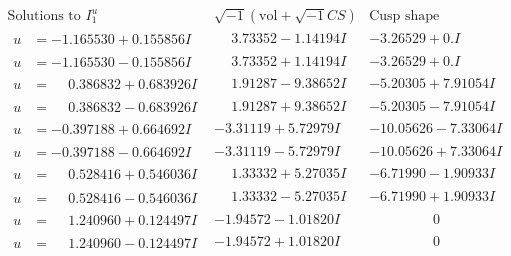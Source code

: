 \documentclass[1p]{elsarticle_modified}
\theoremstyle{definition}
\newcommand{\I}{\sqrt{-1}}
\begin{document}
$$\begin{array}{c|c|c}  
\text{Solutions to }I^u_{1}& \I (\text{vol} + \sqrt{-1}CS) & \text{Cusp shape}\\
 \hline 
\begin{aligned}
u &= -1.165530 + 0.155856 I\end{aligned}
 & \phantom{-}3.73352 - 1.14194 I & -3.26529 + 0. I\phantom{ +0.000000I} \\ \hline\begin{aligned}
u &= -1.165530 - 0.155856 I\end{aligned}
 & \phantom{-}3.73352 + 1.14194 I & -3.26529 + 0. I\phantom{ +0.000000I} \\ \hline\begin{aligned}
u &= \phantom{-}0.386832 + 0.683926 I\end{aligned}
 & \phantom{-}1.91287 - 9.38652 I & -5.20305 + 7.91054 I \\ \hline\begin{aligned}
u &= \phantom{-}0.386832 - 0.683926 I\end{aligned}
 & \phantom{-}1.91287 + 9.38652 I & -5.20305 - 7.91054 I \\ \hline\begin{aligned}
u &= -0.397188 + 0.664692 I\end{aligned}
 & -3.31119 + 5.72979 I & -10.05626 - 7.33064 I \\ \hline\begin{aligned}
u &= -0.397188 - 0.664692 I\end{aligned}
 & -3.31119 - 5.72979 I & -10.05626 + 7.33064 I \\ \hline\begin{aligned}
u &= \phantom{-}0.528416 + 0.546036 I\end{aligned}
 & \phantom{-}1.33332 + 5.27035 I & -6.71990 - 1.90933 I \\ \hline\begin{aligned}
u &= \phantom{-}0.528416 - 0.546036 I\end{aligned}
 & \phantom{-}1.33332 - 5.27035 I & -6.71990 + 1.90933 I \\ \hline\begin{aligned}
u &= \phantom{-}1.240960 + 0.124497 I\end{aligned}
 & -1.94572 - 1.01820 I & \phantom{-0.000000 } 0 \\ \hline\begin{aligned}
u &= \phantom{-}1.240960 - 0.124497 I\end{aligned}
 & -1.94572 + 1.01820 I & \phantom{-0.000000 } 0 \\ \hline\begin{aligned}

\end{aligned}
\end{array}$$
\end{document}
